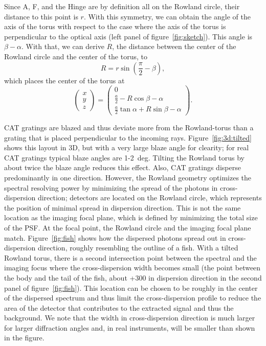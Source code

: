 \documentclass[linenumbers]{aastex631}
\begin{document}
Since A, F, and the Hinge are by definition all on the Rowland circle, their distance to this point is $r$. With this symmetry, we can obtain the angle of the axis of the torus with respect to the case where the axis of the torus is perpendicular to the optical axis (left panel of figure~\ref{fig:sketch}). This angle is $\beta-\alpha$. With that, we can derive $R$, the distance between the center of the Rowland circle and the center of the torus, to
\begin{equation}
    R = r \sin\left(\frac{\pi}{2} - \beta\right),
\end{equation}
which places the center of the torus at
\begin{equation}
    \begin{pmatrix} x \\ y \\ z \end{pmatrix} =
    \begin{pmatrix} 0 \\ \frac{a}{2}-R\cos{\beta-\alpha} \\ \frac{a}{2}\tan{\alpha}+R\sin{\beta-\alpha} \end{pmatrix}.
\end{equation}

CAT gratings are blazed and thus deviate more from the Rowland-torus than a grating that is placed perpendicular to the incoming rays. Figure~\ref{fig:3d:tilted} shows this layout in 3D, but with a very large blaze angle for clearity; for real CAT gratings typical blaze angles are 1-2~deg. Tilting the Rowland torus by about twice the blaze angle reduces this effect. Also, CAT gratings disperse predominantly in one direction. However, the Rowland geometry optimizes the spectral resolving power by minimizing the spread of the photons in cross-dispersion direction; detectors are located on the Rowland circle, which represents the position of minimal spread in dispersion direction. This is not the same location as the imaging focal plane, which is defined by minimizing the total size of the PSF. At the focal point, the Rowland circle and the imaging focal plane match. Figure~\ref{fig:fish} shows how the dispersed photons spread out in cross-dispersion direction, roughly resembling the outline of a fish. With a tilted Rowland torus, there is a second intersection point between the spectral and the imaging focus where the cross-dispersion width becomes small (the point between the body and the tail of the fish, about +300 in dispersion direction in the second panel of figure~\ref{fig:fish}). This location can be chosen to be roughly in the center of the dispersed spectrum and thus limit the cross-dispersion profile to reduce the area of the detector that contributes to the extracted signal and thus the background. We note that the width in cross-dispersion direction is much larger for larger diffraction angles and, in real instruments, will be smaller than shown in the figure.
\end{document}
